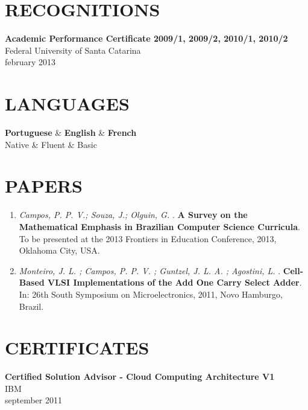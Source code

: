 \documentclass[margin=<value>,11pt]{res} %
\begin{document}
\begin{resume}
\section{RECOGNITIONS}
	{\bf Academic Performance Certificate 2009/1, 2009/2, 2010/1, 2010/2}\\
	Federal University of Santa Catarina\\
	february 2013

\section{LANGUAGES}
	\begin{ncolumn}{3}
	{\bf Portuguese} & {\bf English}        & {\bf French} \\
	Native    & Fluent & Basic  \\
	\end{ncolumn}

\section{PAPERS}
\begin{enumerate}
	\item \emph{Campos, P. P. V.; Souza, J.; Olguin, G.} . \textbf{A Survey on the Mathematical Emphasis in Brazilian Computer Science Curricula}. To be presented at the 2013 Frontiers in Education Conference, 2013, Oklahoma City, USA.
	\item \emph{Monteiro, J. L. ; Campos, P. P. V. ; Guntzel, J. L. A. ; Agostini, L.} . \textbf{Cell-Based VLSI Implementations of the Add One Carry Select Adder}. In: 26th South Symposium on Microelectronics, 2011, Novo Hamburgo, Brazil.
\end{enumerate}


\section{CERTIFICATES}
{\bf Certified Solution Advisor - Cloud Computing Architecture V1}\\
IBM\\
september 2011

\end{resume} 
\end{document}
